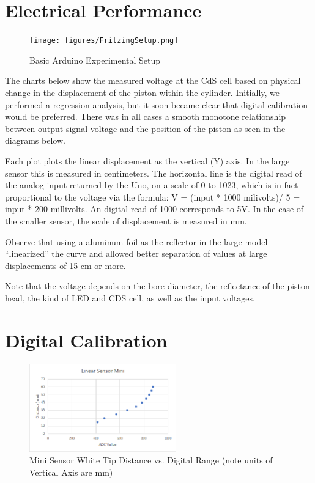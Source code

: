 \documentclass[10pt,conference,compsocconf]{IEEEtran}
\begin{document}
\section{Electrical Performance}

\begin{figure}
  \centering
  \texttt{[image: figures/FritzingSetup.png]}
  \caption{Basic Arduino Experimental Setup}  
\end{figure}

The charts below show the measured voltage at the CdS cell based on
physical change in the displacement of the piston within the
cylinder. Initially, we performed a regression analysis, but it soon
became clear that digital calibration would be preferred. There was in
all cases a smooth monotone relationship between output signal voltage
and the position of the piston as seen in the diagrams below.

Each plot plots the linear displacement as the vertical (Y) axis. In
the large sensor this is measured in centimeters. The horizontal line
is the digital read of the analog input returned by the Uno, on a
scale of 0 to 1023, which is in fact proportional to the voltage via
the formula: V = (input * 1000 milivolts)/ 5 = input * 200
millivolts. An digital read of 1000 corresponds to 5V. In the case of
the smaller sensor, the scale of displacement is measured in mm.

Observe that using a aluminum foil as the reflector in the large model
“linearized” the curve and allowed better separation of values at
large displacements of 15 cm or more.

Note that the voltage depends on the bore diameter, the reflectance of the
piston head, the kind of LED and CDS cell, as well as the input
voltages.

\section{Digital Calibration}


\begin{figure}
  \centering
  \includegraphics[width=2.5in]{figures/MiniDistanceVsRead.png}
  \caption{Mini Sensor White Tip Distance vs. Digital Range (note units of Vertical Axis are mm)}  
\end{figure}
\end{document}
